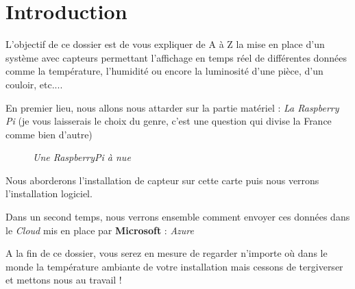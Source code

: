 \chapter*{Introduction}



L'objectif de ce dossier est de vous expliquer de A à Z la mise en place d'un système avec capteurs permettant l'affichage en temps réel de différentes données comme la température, l'humidité ou encore la luminosité d'une pièce, d'un couloir, etc....

En premier lieu, nous allons nous attarder sur la partie matériel : \textit{La Raspberry Pi} (je vous laisserais le choix du genre, c'est une question qui divise la France comme bien d'autre)

\begin{figure}[H]
\begin{center}
\end{center}
	\caption{ \textit{Une RaspberryPi à nue}}
\end{figure}

Nous aborderons l'installation de capteur sur cette carte puis nous verrons l'installation logiciel.

Dans un second temps, nous verrons ensemble comment envoyer ces données dans le \textit{Cloud} mis en place par \textbf{Microsoft} : \textit{Azure} 

A la fin de ce dossier, vous serez en mesure de regarder n'importe où dans le monde la température ambiante de votre installation mais cessons de tergiverser et mettons nous au travail !